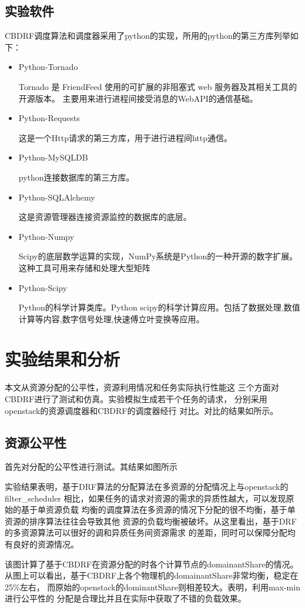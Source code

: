 \subsection{实验软件}
CBDRF调度算法和调度器采用了python的实现，所用的python的第三方库列举如下：
\begin{itemize}
\item Python-Tornado 

Tornado 是 FriendFeed 使用的可扩展的非阻塞式 web 服务器及其相关工具的开源版本。
主要用来进行进程间接受消息的WebAPI的通信基础。
\item Python-Requests 

这是一个Http请求的第三方库，用于进行进程间http通信。
\item Python-MySQLDB  

python连接数据库的第三方库。
\item Python-SQLAlchemy 

这是资源管理器连接资源监控的数据库的底层。
\item Python-Numpy 

Scipy的底层数学运算的实现，NumPy系统是Python的一种开源的数字扩展。这种工具可用来存储和处理大型矩阵
\item Python-Scipy 

Python的科学计算类库。Python scipy的科学计算应用。包括了数据处理,数值计算等内容,数字信号处理,快速傅立叶变换等应用。
\end{itemize}


\section{实验结果和分析}
本文从资源分配的公平性，资源利用情况和任务实际执行性能这
三个方面对CBDRF进行了测试和仿真。实验模拟生成若干个任务的请求，
分别采用openstack的资源调度器和CBDRF的调度器经行
对比。对比的结果如所示。
\subsection{资源公平性}
首先对分配的公平性进行测试。其结果如图所示

实验结果表明，基于DRF算法的分配算法在多资源的分配情况上与openstack的filter\_scheduler
相比，如果任务的请求对资源的需求的异质性越大，可以发现原始的基于单资源负载
均衡的调度算法在多资源的情况下分配的很不均衡，基于单资源的排序算法往往会导致其他
资源的负载均衡被破坏。从这里看出，基于DRF的多资源算法可以很好的调和异质任务间资源需求
的差距，同时可以保障分配均有良好的资源情况。


该图计算了基于CBDRF在资源分配的时各个计算节点的domainantShare的情况。
从图上可以看出，基于CBDRF上各个物理机的domainantShare非常均衡，稳定在25\%左右，
而原始的openstack的dominantShare则相差较大。表明，利用max-min进行公平性的
分配是合理比并且在实际中获取了不错的负载效果。

